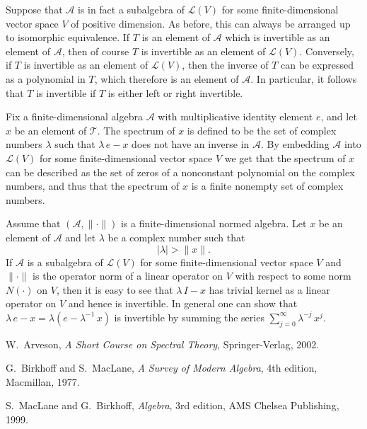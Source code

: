 \documentclass[12pt,leqno,draft]{article}
\begin{document}
	Suppose that $\mathcal{A}$ is in fact a subalgebra of
$\mathcal{L}(V)$ for some finite-dimensional vector space $V$ of
positive dimension.  As before, this can always be arranged up to
isomorphic equivalence.  If $T$ is an element of $\mathcal{A}$ which
is invertible as an element of $\mathcal{A}$, then of course $T$ is
invertible as an element of $\mathcal{L}(V)$.  Conversely, if $T$ is
invertible as an element of $\mathcal{L}(V)$, then the inverse of $T$
can be expressed as a polynomial in $T$, which therefore is an element
of $\mathcal{A}$.  In particular, it follows that $T$ is invertible if
$T$ is either left or right invertible.

	Fix a finite-dimensional algebra $\mathcal{A}$ with
multiplicative identity element $e$, and let $x$ be an element of
$\mathcal{T}$.  The spectrum of $x$ is defined to be the set of
complex numbers $\lambda$ such that $\lambda \, e - x$ does not have
an inverse in $\mathcal{A}$.  By embedding $\mathcal{A}$ into
$\mathcal{L}(V)$ for some finite-dimensional vector space $V$ we get
that the spectrum of $x$ can be described as the set of zeros of a
nonconstant polynomial on the complex numbers, and thus that the
spectrum of $x$ is a finite nonempty set of complex numbers.

	Assume that $(\mathcal{A}, \|\cdot \|)$ is a
finite-dimensional normed algebra.  Let $x$ be an element of
$\mathcal{A}$ and let $\lambda$ be a complex number such that
\begin{equation}
	|\lambda| > \|x\|.
\end{equation}
If $\mathcal{A}$ is a subalgebra of $\mathcal{L}(V)$ for some
finite-dimensional vector space $V$ and $\|\cdot \|$ is the operator
norm of a linear operator on $V$ with respect to some norm $N(\cdot )$
on $V$, then it is easy to see that $\lambda \, I - x$ has trivial
kernel as a linear operator on $V$ and hence is invertible.  In
general one can show that $\lambda \, e - x = \lambda (e -
\lambda^{-1} \, x)$ is invertible by summing the series $\sum_{j =
0}^\infty \lambda^{-j} \, x^j$.

	



\begin{thebibliography}{3}


 W.~Arveson, {\it A Short Course on Spectral Theory},
Springer-Verlag, 2002.

 G.~Birkhoff and S.~MacLane, {\it A Survey of Modern Algebra},
4th edition, Macmillan, 1977.

 S.~MacLane and G.~Birkhoff, {\it Algebra}, 3rd edition,
AMS Chelsea Publishing, 1999.




\end{thebibliography}
\end{document}
